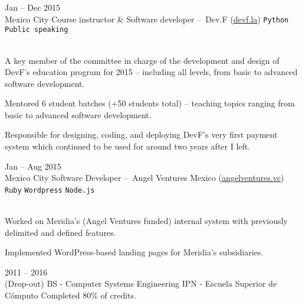 \documentclass[9pt]{developercv} %
\begin{document}
\begin{entrylist}
    \entry
        {
            Jan -- Dec 2015
            \\\footnotesize{Mexico City}
        }
        {Course instructor \& Software developer – Dev.F ({\href{https://devf.la/}{\underline{devf.la}}})}
        {
            \texttt{Python}
            \slashsep\texttt{Public speaking}
        }
        {\\
            A key member of the committee in charge of the development and design of DevF's education program for 2015 – including all levels, from basic to advanced software development. 

            Mentored 6 student batches (+50 students total) – teaching topics ranging from basic to advanced software development.
            
            Responsible for designing, coding, and deploying DevF's very first payment system which continued to be used for around two years after I left.\\
        }

    \entry
        {
            Jan -- Aug 2015
            \\\footnotesize{Mexico City}
        }
        {Software Developer – Angel Ventures Mexico ({\href{http://www.angelventures.vc/}{\underline{angelventures.vc}}})}
        {   
            \texttt{Ruby}
            \slashsep\texttt{Wordpress}
            \slashsep\texttt{Node.js}
        }
        {\\
            Worked on Meridia's (Angel Ventures funded) internal system with previously delimited and defined features. 

            Implemented WordPress-based landing pages for Meridia's subsidiaries.\\
        }

\end{entrylist}



\begin{entrylist}
    \entry
        {
            2011 -- 2016
            \\\footnotesize{(Drop-out)}
        }
        {BS - Computer Systems Engineering}
        {IPN - Escuela Superior de Cómputo}
        {Completed 80\% of credits.}
\end{entrylist}
\end{document}
